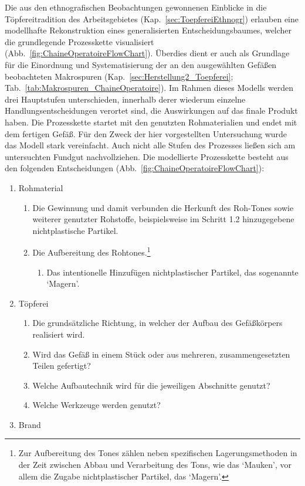 Die aus den ethnografischen Beobachtungen gewonnenen Einblicke in die Töpfereitradition des Arbeitsgebietes (Kap.~\ref{sec:ToepfereiEthnogr}) erlauben eine modellhafte Rekonstruktion eines generalisierten Entscheidungsbaumes, welcher die grundlegende Prozesskette visualisiert (Abb.~\ref{fig:ChaineOperatoireFlowChart}). Überdies dient er auch als Grundlage für die Einordnung und Systematisierung der an den ausgewählten Gefäßen beobachteten Makrospuren (Kap.~\ref{sec:Herstellung2_Toepferei}; Tab.~\ref{tab:Makrospuren_ChaineOperatoire}). Im Rahmen dieses Modells werden drei Hauptstufen unterschieden, innerhalb derer wiederum einzelne Handlungsentscheidungen verortet sind, die Auswirkungen auf das finale Produkt haben. Die Prozesskette startet mit den genutzten Rohmaterialien und endet mit dem fertigen Gefäß. Für den Zweck der hier vorgestellten Untersuchung wurde das Modell stark vereinfacht. Auch nicht alle Stufen des Prozesses ließen sich am untersuchten Fundgut nachvollziehen. Die modellierte Prozesskette besteht aus den folgenden Entscheidungen (Abb.~\ref{fig:ChaineOperatoireFlowChart}):

\begin{enumerate}[label=\arabic*,ref=\arabic*]\setlength\itemsep{-0.25em}
	\item Rohmaterial
	\begin{enumerate}[label*=.\arabic*,ref=\theenumi.\arabic*]\setlength\itemsep{-0.25em}
		\item Die Gewinnung und damit verbunden die Herkunft des Roh-Tones sowie weiterer genutzter Rohstoffe, beispielsweise im Schritt 1.2 hinzugegebene nichtplastische Partikel.
		\item Die Aufbereitung des Rohtones.\footnote{Zur Aufbereitung des Tones zählen neben spezifischen Lagerungsmethoden in der Zeit zwischen Abbau und Verarbeitung des Tons, wie das \enquote*{Mauken}, vor allem die Zugabe nichtplastischer Partikel, das \enquote*{Magern}.}
		\begin{enumerate}[label*=.\arabic*,ref=\theenumi.\arabic*]\setlength\itemsep{-0.25em}
			\item Das intentionelle Hinzufügen nichtplastischer Partikel, das sogenannte \enquote*{Magern}.
		\end{enumerate}
	\end{enumerate}
	\item Töpferei
	\begin{enumerate}[label*=.\arabic*,ref=\theenumi.\arabic*]\setlength\itemsep{-0.25em}
		\item Die grundsätzliche Richtung, in welcher der Aufbau des Gefäßkörpers realisiert wird.
		\item Wird das Gefäß in einem Stück oder aus mehreren, zusammengesetzten Teilen gefertigt?
		\item Welche Aufbautechnik wird für die jeweiligen Abschnitte genutzt?
		\item Welche Werkzeuge werden genutzt?
	\end{enumerate}
	\item Brand
\end{enumerate}

